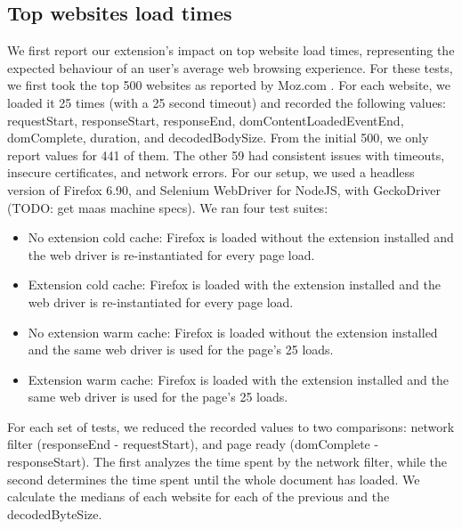 \subsection{Top websites load times}
We first report our extension's impact on top website load times, representing the expected behaviour of an user's average web browsing experience. For these tests, we first took the top 500 websites as reported by Moz.com \cite{top500}. For each website, we loaded it 25 times (with a 25 second timeout) and recorded the following values: requestStart, responseStart, responseEnd, domContentLoadedEventEnd, domComplete, duration, and decodedBodySize. From the initial 500, we only report values for 441 of them. The other 59 had consistent issues with timeouts, insecure certificates, and network errors. For our setup, we used a headless version of Firefox 6.90, and Selenium WebDriver for NodeJS, with GeckoDriver (TODO: get maas machine specs). We ran four test suites:
\begin{itemize}
	\item No extension cold cache: Firefox is loaded without the extension installed and the web driver is re-instantiated for every page load.
	\item Extension cold cache: Firefox is loaded with the extension installed and the web driver is re-instantiated for every page load.
	\item No extension warm cache: Firefox is loaded without the extension installed and the same web driver is used for the page's 25 loads.
	\item Extension warm cache: Firefox is loaded with the extension installed and the same web driver is used for the page's 25 loads.
\end{itemize}

For each set of tests, we reduced the recorded values to two comparisons: network filter (responseEnd - requestStart), and page ready (domComplete - responseStart). The first analyzes the time spent by the network filter, while the second determines the time spent until the whole document has loaded. We calculate the medians of each website for each of the previous and the decodedByteSize.

